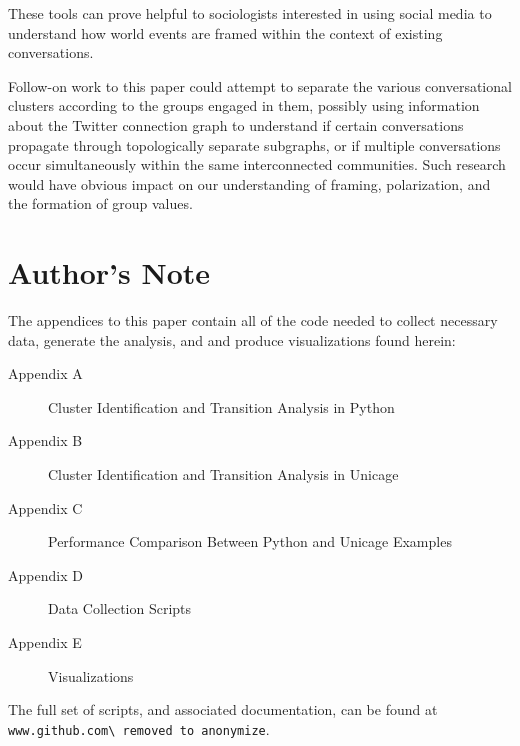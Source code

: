 \documentclass[12pt]{article}
\begin{document}
These tools can prove helpful to sociologists interested in using social media to understand how world events are framed within the context of existing conversations.

Follow-on work to this paper could attempt to separate the various conversational clusters according to the groups engaged in them, possibly using information about the Twitter connection graph to understand if certain conversations propagate through topologically separate subgraphs, or if multiple conversations occur simultaneously within the same interconnected communities. Such research would have obvious impact on our understanding of framing, polarization, and the formation of group values.

\section{Author's Note}
The appendices to this paper contain all of the code needed to collect necessary data, generate the analysis, and and produce visualizations found herein:

\begin{description}
  \item[Appendix A] Cluster Identification and Transition Analysis in Python
  \item[Appendix B] Cluster Identification and Transition Analysis in Unicage
  \item[Appendix C] Performance Comparison Between Python and Unicage Examples
  \item[Appendix D] Data Collection Scripts
  \item[Appendix E] Visualizations
\end{description}

The full set of scripts, and associated documentation, can be found at \verb|www.github.com\ removed to anonymize|. 



{}
\end{document}
